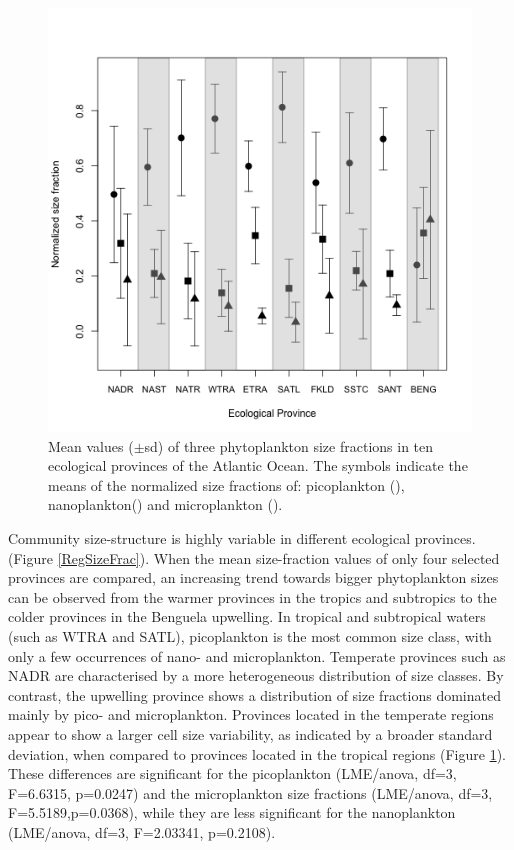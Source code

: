 \begin{figure}
\centering
\includegraphics[trim = 0mm 0mm 0mm 0mm, clip, width=0.8\linewidth]{./Chp2-Pre/amt_MeanSDProvinces.png}
\caption[Scheme]{\small {Mean values ($\pm$sd) of three phytoplankton size fractions in ten ecological provinces of the Atlantic Ocean. The symbols indicate the means of the normalized size fractions of: picoplankton (), nanoplankton() and microplankton ().}}
\label{means}
\end{figure}

Community size-structure is highly variable in different ecological provinces. (Figure \ref{RegSizeFrac}). When the mean size-fraction values of only four selected provinces are compared, an increasing trend towards bigger phytoplankton sizes can be observed from the warmer provinces in the tropics and subtropics to the colder provinces in the Benguela upwelling. In tropical and subtropical waters (such as WTRA and SATL), picoplankton is the most common size class, with only a few occurrences of nano- and microplankton. Temperate provinces such as NADR are characterised by a more heterogeneous distribution of size classes. By contrast, the upwelling province  shows a distribution of size fractions dominated mainly by pico- and microplankton. Provinces located in the temperate regions appear to show a larger cell size variability, as indicated by a broader standard deviation, when compared to provinces located in the tropical regions (Figure \ref{means}). These differences are significant for the picoplankton (LME/anova, df=3, F=6.6315, p=0.0247) and the microplankton size fractions (LME/anova, df=3, F=5.5189,p=0.0368), while they are less significant for the nanoplankton (LME/anova, df=3, F=2.03341, p=0.2108).

